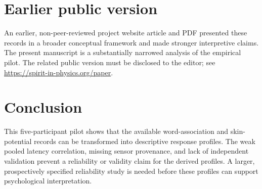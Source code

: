 \documentclass[a4paper,12pt]{article}
\begin{document}
\ifdefined\sjpblind\else\section{Earlier public version}
An earlier, non-peer-reviewed project website article and PDF presented these records in a broader conceptual framework and made stronger interpretive claims. The present manuscript is a substantially narrowed analysis of the empirical pilot. The related public version must be disclosed to the editor; see \url{https://spirit-in-physics.org/paper}.

\fi

\section{Conclusion}
This five-participant pilot shows that the available word-association and skin-potential records can be transformed into descriptive response profiles. The weak pooled latency correlation, missing sensor provenance, and lack of independent validation prevent a reliability or validity claim for the derived profiles. A larger, prospectively specified reliability study is needed before these profiles can support psychological interpretation.

\begingroup\footnotesize


\endgroup
\end{document}
